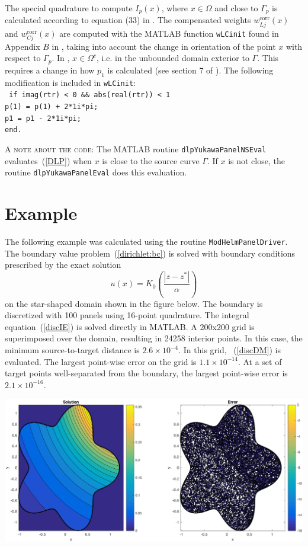 \documentclass[12pt]{article}
\newcommand{\eqr}[1]{~(\ref{#1})}
\begin{document}
The special quadrature to compute $I_p(x)$, where $x\in \Omega$ and close to $\Gamma_p$ is calculated according to equation (33) in \cite{HelsingHolst}. The compensated weights $w_{Lj}^{\mbox{corr}} (x)$ and $w_{Cj}^{\mbox{corr}} (x)$ are computed with the MATLAB function \texttt{wLCinit} found in Appendix $B$ in \cite{HelsingHolst}, taking into account the change in orientation of the point $x$ with respect to $\Gamma_p$. In \cite{HelsingHolst}, $x \in \Omega^c$, i.e. in the unbounded domain exterior to $\Gamma$. This requires a change in how $p_1$ is calculated (see section 7 of \cite{HelsingOjala}). The following modification is included in  \texttt{wLCinit}: \\
\texttt{
\noindent if imag(rtr) < 0 \&\& abs(real(rtr)) < 1 \\
 \hspace{.5in} p(1) = p(1) + 2*1i*pi; \\
 \hspace{.5in}         p1 = p1 - 2*1i*pi;  \\
    end. \\
}

\noindent \textsc{A note about the code:} The MATLAB routine \texttt{dlpYukawaPanelNSEval} evaluates\eqr{DLP} when $x$ is close to the source curve $\Gamma$. If $x$ is not close, the routine  \texttt{dlpYukawaPanelEval} does this evaluation.



\section{Example}
The following example was calculated using the routine \texttt{ModHelmPanelDriver}. 
The boundary value problem\eqr{dirichlet:bc} is solved with boundary conditions prescribed by the exact solution
\[
u(x) = K_0 \left( \frac{|z - z^*|}{\alpha} \right) 
\]
on the star-shaped domain shown in the figure below. The boundary is  discretized with 100 panels using 16-point quadrature. The integral equation\eqr{discIE} is solved directly in MATLAB.  A 200x200 grid is superimposed over the domain, resulting in 24258 interior points. In this case, the minimum source-to-target distance is $2.6 \times 10^{-4}$. In this grid, \eqr{discDM} is evaluated. The largest point-wise error on the grid is $1.1 \times 10^{-14}$.  At a set of target points well-separated from the boundary, the largest point-wise error is $2.1 \times 10^{-16}$.

\begin{center}
\includegraphics[width=6in]{Yukawa_Ex.eps}
\end{center}
\end{document}
